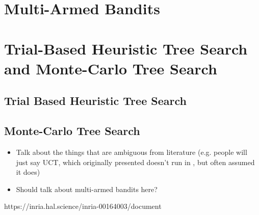 \section{Multi-Armed Bandits}
\label{sec:3-2-mab}


\section{Trial-Based Heuristic Tree Search and Monte-Carlo Tree Search}
\label{sec:3-3-thts}

    \subsection{Trial Based Heuristic Tree Search}
    \label{sec:3-3-1-thts}




    \subsection{Monte-Carlo Tree Search}
    \label{sec:3-3-2-mcts}

        \begin{itemize}
            \item Talk about the things that are ambiguous from literature (e.g. people will just say UCT, which originally presented doesn't run in \mctsmode, but often assumed it does)
            \item Should talk about multi-armed bandits here?
        \end{itemize}

        https://inria.hal.science/inria-00164003/document

